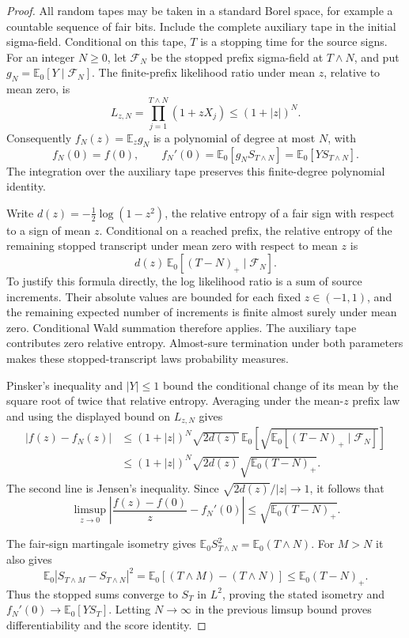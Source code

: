 \begin{proof}
All random tapes may be taken in a standard Borel space, for example
a countable sequence of fair bits.  Include the complete auxiliary
tape in the initial sigma-field.  Conditional on this tape, $T$ is a
stopping time for the source signs.  For an integer $N\ge0$, let
$\mathcal F_N$ be the stopped prefix sigma-field at $T\wedge N$, and
put $g_N=\mathbb E_0[Y\mid\mathcal F_N]$.  The finite-prefix likelihood
ratio under mean $z$, relative to mean zero, is
\[
 L_{z,N}=\prod_{j=1}^{T\wedge N}(1+zX_j)
       \le(1+|z|)^N.
\]
Consequently $f_N(z)=\mathbb E_z g_N$ is a polynomial of degree at
most $N$, with
\[
 f_N(0)=f(0),\qquad
 f_N'(0)=\mathbb E_0[g_NS_{T\wedge N}]
        =\mathbb E_0[YS_{T\wedge N}].
\]
The integration over the auxiliary tape preserves this finite-degree
polynomial identity.

Write $d(z)=-\tfrac12\log(1-z^2)$, the relative entropy of a fair
sign with respect to a sign of mean $z$.  Conditional on a reached
prefix, the relative entropy of the remaining stopped transcript
under mean zero with respect to mean $z$ is
\[
 d(z)\,\mathbb E_0[(T-N)_+\mid\mathcal F_N].
\]
To justify this formula directly, the log likelihood ratio is a sum
of source increments.  Their absolute values are bounded for each
fixed $z\in(-1,1)$, and the remaining expected number of increments
is finite almost surely under mean zero.  Conditional Wald summation
therefore applies.  The auxiliary tape contributes zero relative
entropy.  Almost-sure termination under both parameters makes these
stopped-transcript laws probability measures.

Pinsker's inequality and $|Y|\le1$ bound the conditional change of
its mean by the square root of twice that relative entropy.  Averaging
under the mean-$z$ prefix law and using the displayed bound on
$L_{z,N}$ gives
\begin{align*}
 |f(z)-f_N(z)|
 &\le (1+|z|)^N
      \sqrt{2d(z)}\,
      \mathbb E_0\!\left[
       \sqrt{\mathbb E_0[(T-N)_+\mid\mathcal F_N]}\right]\\
 &\le (1+|z|)^N\sqrt{2d(z)}
           \sqrt{\mathbb E_0(T-N)_+}.
\end{align*}
The second line is Jensen's inequality.  Since
$\sqrt{2d(z)}/|z|\longrightarrow1$, it follows that
\[
 \limsup_{z\to0}
 \left|\frac{f(z)-f(0)}z-f_N'(0)\right|
 \le\sqrt{\mathbb E_0(T-N)_+}.
\]

The fair-sign martingale isometry gives
$\mathbb E_0 S_{T\wedge N}^2=\mathbb E_0(T\wedge N)$.
For $M>N$ it also gives
\[
 \mathbb E_0|S_{T\wedge M}-S_{T\wedge N}|^2
   =\mathbb E_0[(T\wedge M)-(T\wedge N)]
   \le\mathbb E_0(T-N)_+.
\]
Thus the stopped sums converge to $S_T$ in $L^2$, proving the stated
isometry and $f_N'(0)\to\mathbb E_0[YS_T]$.  Letting $N\to\infty$
in the previous limsup bound proves differentiability and the score
identity.
\end{proof}

